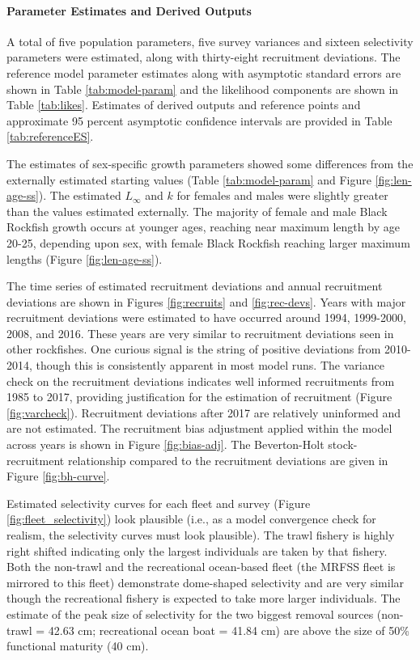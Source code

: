 \documentclass[11pt,
  english,
  letterpaper,
]{article}
\begin{document}
\hypertarget{parameter-estimates-and-derived-outputs}{%
\paragraph{Parameter Estimates and Derived Outputs}\label{parameter-estimates-and-derived-outputs}}

A total of five population parameters, five survey variances and sixteen selectivity parameters were estimated, along with thirty-eight recruitment deviations. The reference model parameter estimates along with asymptotic standard errors are shown in Table \ref{tab:model-param} and the likelihood components are shown in Table \ref{tab:likes}. Estimates of derived outputs and reference points and approximate 95 percent asymptotic confidence intervals are provided in Table \ref{tab:referenceES}.

The estimates of sex-specific growth parameters showed some differences from the externally estimated starting values (Table \ref{tab:model-param} and Figure \ref{fig:len-age-ss}). The estimated \(L_{\infty}\) and \(k\) for females and males were slightly greater than the values estimated externally. The majority of female and male Black Rockfish growth occurs at younger ages, reaching near maximum length by age 20-25, depending upon sex, with female Black Rockfish reaching larger maximum lengths (Figure \ref{fig:len-age-ss}).

The time series of estimated recruitment deviations and annual recruitment deviations are shown in Figures \ref{fig:recruits} and \ref{fig:rec-devs}. Years with major recruitment deviations were estimated to have occurred around 1994, 1999-2000, 2008, and 2016. These years are very similar to recruitment deviations seen in other rockfishes. One curious signal is the string of positive deviations from 2010-2014, though this is consistently apparent in most model runs. The variance check on the recruitment deviations indicates well informed recruitments from 1985 to 2017, providing justification for the estimation of recruitment (Figure \ref{fig:varcheck}). Recruitment deviations after 2017 are relatively uninformed and are not estimated. The recruitment bias adjustment applied within the model across years is shown in Figure \ref{fig:bias-adj}. The Beverton-Holt stock-recruitment relationship compared to the recruitment deviations are given in Figure \ref{fig:bh-curve}.

Estimated selectivity curves for each fleet and survey (Figure \ref{fig:fleet_selectivity}) look plausible (i.e., as a model convergence check for realism, the selectivity curves must look plausible). The trawl fishery is highly right shifted indicating only the largest individuals are taken by that fishery. Both the non-trawl and the recreational ocean-based fleet (the MRFSS fleet is mirrored to this fleet) demonstrate dome-shaped selectivity and are very similar though the recreational fishery is expected to take more larger individuals. The estimate of the peak size of selectivity for the two biggest removal sources (non-trawl = 42.63 cm; recreational ocean boat = 41.84 cm) are above the size of 50\% functional maturity (40 cm).
\end{document}
